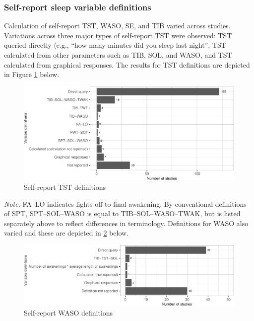 \documentclass[
]{article}
\begin{document}
\subsubsection{Self-report sleep variable definitions}\label{self-report-sleep-variable-definitions}

Calculation of self-report TST, WASO, SE, and TIB varied across studies. Variations across three major types of self-report TST were observed: TST queried directly (e.g., ``how many minutes did you sleep last night'', TST calculated from other parameters such as TIB, SOL, and WASO, and TST calculated from graphical responses. The results for TST definitions are depicted in Figure \ref{fig:tstdefinitions} below.

\begin{figure}
\centering
\includegraphics{review_markdown_files/figure-latex/tstdefinitions-1.pdf}
\caption{\label{fig:tstdefinitions}Self-report TST definitions}
\end{figure}

\emph{Note.} FA--LO indicates lights off to final awakening. By conventional definitions of SPT, SPT--SOL--WASO is equal to TIB--SOL--WASO--TWAK, but is listed separately above to reflect differences in terminology.
Definitions for WASO also varied and these are depicted in \ref{fig:wasodef} below.

\begin{figure}
\centering
\includegraphics{review_markdown_files/figure-latex/wasodef-1.pdf}
\caption{\label{fig:wasodef}Self-report WASO definitions}
\end{figure}
\end{document}
